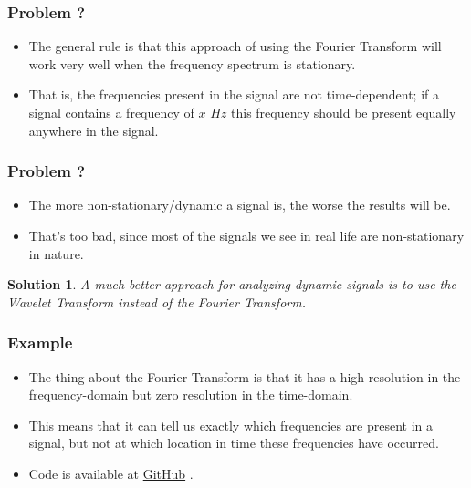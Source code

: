 \documentclass{beamer}
\newcommand{\github}{
\href{https://github.com/A-M-Kharazi/Machine-Learning-TMU}{GitHub}
}
\newtheorem{solu}{Solution}
\begin{document}
\begin{frame}
	\frametitle{Problem ? }
	
	\begin{itemize}
		\item 
			The general rule is that this approach of using the Fourier Transform will work very well when the frequency spectrum is stationary.
		
		\item
		
		That is, the frequencies present in the signal are not time-dependent; if a signal contains a frequency of $x$ $Hz$ this frequency should be present equally anywhere in the signal.
		
	\end{itemize}
	
\end{frame}


\begin{frame}
	\frametitle{Problem ?}
	
	\begin{itemize}
		\item
		The more non-stationary/dynamic a signal is, the worse the results will be.
		
		\item
		That’s too bad, since most of the signals we see in real life are non-stationary in nature.
		
	\end{itemize}


	\begin{solu}
		A much better approach for analyzing dynamic signals is to use the Wavelet Transform instead of the Fourier Transform.
	\end{solu}

\end{frame}

\begin{frame}
	\frametitle{Example}
	
	\begin{itemize}
		\item 
		The thing about the Fourier Transform is that it has a high resolution in the frequency-domain but zero resolution in the time-domain.
		
		\item
		
		This means that it can tell us exactly which frequencies are present in a signal, but not at which location in time these frequencies have occurred.
		
		\item 
		Code is available at \github.
		
	\end{itemize}
	
\end{frame}
\end{document}
